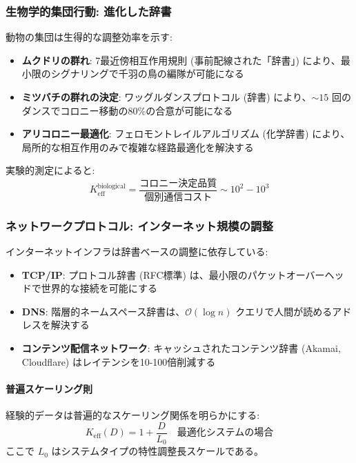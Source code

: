 \documentclass[11pt,a4paper]{article}
\begin{document}
	\subsubsection{生物学的集団行動: 進化した辞書}
	動物の集団は生得的な調整効率を示す:
	\begin{itemize}
		\item \textbf{ムクドリの群れ}: 7最近傍相互作用規則 (事前配線された「辞書」) により、最小限のシグナリングで千羽の鳥の編隊が可能になる
		\item \textbf{ミツバチの群れの決定}: ワッグルダンスプロトコル (辞書) により、$\sim 15$ 回のダンスでコロニー移動の80\%の合意が可能になる
		\item \textbf{アリコロニー最適化}: フェロモントレイルアルゴリズム (化学辞書) により、局所的な相互作用のみで複雑な経路最適化を解決する
	\end{itemize}
	
	実験的測定によると:
	\begin{equation}
		K_{\mathrm{eff}}^{\text{biological}} = \frac{\text{コロニー決定品質}}{\text{個別通信コスト}} \sim 10^2 - 10^3
	\end{equation}
	
	\subsubsection{ネットワークプロトコル: インターネット規模の調整}
	インターネットインフラは辞書ベースの調整に依存している:
	\begin{itemize}
		\item \textbf{TCP/IP}: プロトコル辞書 (RFC標準) は、最小限のパケットオーバーヘッドで世界的な接続を可能にする
		\item \textbf{DNS}: 階層的ネームスペース辞書は、$\mathcal{O}(\log n)$ クエリで人間が読めるアドレスを解決する
		\item \textbf{コンテンツ配信ネットワーク}: キャッシュされたコンテンツ辞書 (Akamai, Cloudflare) はレイテンシを10-100倍削減する
	\end{itemize}
	
	\paragraph{普遍スケーリング則}
	経験的データは普遍的なスケーリング関係を明らかにする:
	\begin{equation}
		\boxed{K_{\mathrm{eff}}(D) = 1 + \frac{D}{L_0} \quad \text{最適化システムの場合}}
	\end{equation}
	ここで $L_0$ はシステムタイプの特性調整長スケールである。
	
\end{document}
